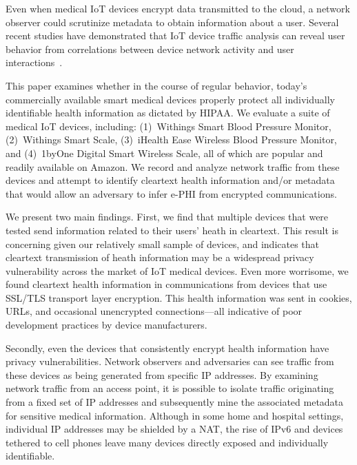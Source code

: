Even when medical IoT devices encrypt data transmitted to the cloud, a network
observer could scrutinize metadata to obtain information about a user.
Several recent studies have demonstrated that IoT device traffic analysis can
reveal user behavior  from correlations between device network activity and
user interactions~\cite{apthorpeIoT}.

This paper examines whether in the course of regular behavior, today's
commercially available smart medical devices properly protect all individually
identifiable health information as dictated by HIPAA.  We evaluate a suite of
medical IoT devices, including: (1)~Withings Smart Blood Pressure Monitor,
(2)~Withings Smart Scale, (3)~iHealth Ease Wireless Blood Pressure Monitor, and (4)~1byOne
Digital Smart Wireless Scale, all of which are popular and readily available
on Amazon. We record and analyze network traffic from these devices and
attempt to identify cleartext health information and/or metadata that would
allow an adversary to infer e-PHI from encrypted communications.

We present two main findings. First, we find that multiple devices that were
tested send information related to their users' heath in cleartext. This
result is concerning given our relatively small sample of devices, and
indicates that cleartext transmission of heath information may be a widespread
privacy vulnerability across the market of IoT medical devices. Even more
worrisome, we found cleartext health information in communications from
devices that use SSL/TLS transport layer encryption. This health information
was sent in cookies, URLs, and occasional unencrypted connections---all
indicative of poor development practices by device manufacturers.

Secondly, even the devices that consistently encrypt health information have privacy
vulnerabilities. Network observers and adversaries can see
traffic from these devices as being generated from specific IP addresses. By
examining network traffic from an access point, it is possible to isolate
traffic originating from a fixed set of IP addresses and subsequently mine the
associated metadata for sensitive medical information. Although in some home and
hospital settings, individual IP addresses may be shielded by a NAT, the rise
of IPv6 and devices tethered to cell phones leave many devices directly exposed
and individually identifiable.

